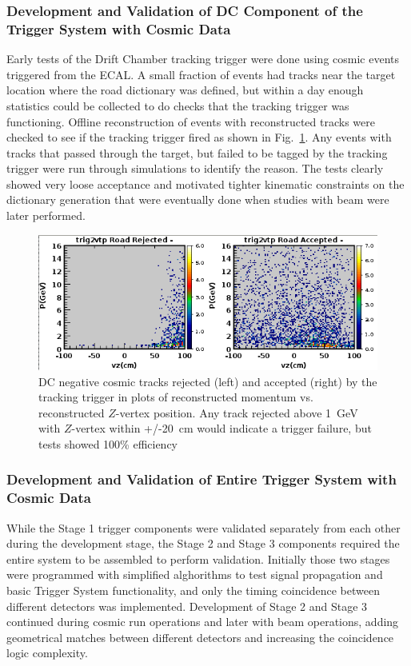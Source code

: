 \subsubsection{Development and Validation of DC Component of the Trigger System with Cosmic Data}

Early tests of the Drift Chamber tracking trigger were done using cosmic events triggered from the ECAL. A small fraction of events had tracks near the target location where the road dictionary was defined, but within a day enough statistics could be collected to do checks that the tracking trigger was functioning. Offline reconstruction of events with reconstructed tracks were checked to see if the tracking trigger fired as shown in Fig.~\ref{fig:dc_cosmic_efficiency}. Any events with tracks that passed through the target, but failed to be tagged by the tracking trigger were run through simulations to identify the reason. The tests clearly showed very loose acceptance and motivated tighter kinematic constraints on the dictionary generation that were eventually done when studies with beam were later performed.

\begin{figure}[!htb]
 	\centering
  	\includegraphics[width=1.0\columnwidth,keepaspectratio]{img/dc_cosmic_efficiency.png}
 	\caption{DC negative cosmic tracks rejected (left) and accepted (right) by the tracking trigger in plots of reconstructed momentum vs. reconstructed $Z$-vertex position. Any track rejected above 1~GeV with $Z$-vertex within +/-20~cm would indicate a trigger failure, but tests showed 100\% efficiency}
	\label{fig:dc_cosmic_efficiency}
\end{figure}


\subsubsection{Development and Validation of Entire Trigger System with Cosmic Data} 

While the Stage 1 trigger components were validated separately from each other during the development stage, the Stage 2 and Stage 3 components required the entire system to be assembled to perform validation. Initially those two stages were programmed with simplified alghorithms to test signal propagation and basic Trigger System functionality, and only the timing coincidence between different detectors was implemented. Development of Stage 2 and Stage 3 continued during cosmic run operations and later with beam operations, adding geometrical matches between different detectors and increasing the coincidence logic complexity.


